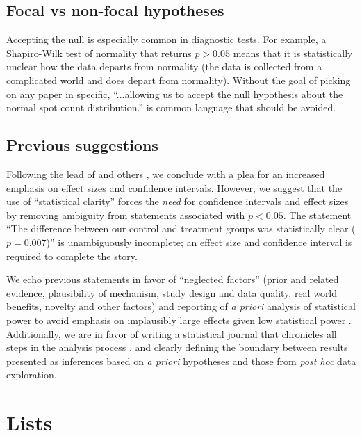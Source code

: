 \subsection*{Focal vs non-focal hypotheses}

Accepting the null is especially common in diagnostic tests.
For example, a Shapiro-Wilk test of normality that
returns $p > 0.05$ means that it is statistically unclear how the data departs from normality (the data is collected
from a complicated world and does depart from normality).
Without the goal of picking on any paper in specific, 
``...allowing us to accept the null hypothesis about the normal spot count distribution.'' \citep{Karulinetal.2015} 
is common language that should be avoided.

\subsection*{Previous suggestions}

Following the lead of \citet{Cohen1994} and others \citep{Goodman1999, ZiliakandMcCloskey2008, WassersteinandLazar2016},
we conclude with a plea for an increased emphasis on effect sizes and confidence intervals.
However, we suggest that the
use of ``statistical clarity'' forces the \emph{need} for confidence intervals and effect sizes by removing ambiguity
from statements associated with $p < 0.05$. The statement ``The difference between our control and treatment groups was
statistically clear ($p = 0.007$)'' is unambiguously incomplete; an effect size and confidence interval 
is required to complete the story.

We echo previous statements in favor of ``neglected factors'' (prior and related evidence, plausibility of mechanism, 
study design and data quality, real world benefits, novelty and other factors) \citep{McShaneetal.2017} and 
reporting of \emph{a priori} analysis of statistical power to avoid emphasis on implausibly large effects given low 
statistical power \citep[the "winners curse"][]{GelmanandCarlin2014, SzucsandIoannidis2017, Bernardietal.2017}. 
Additionally, we are in favor of writing a statistical journal that chronicles all steps in the analysis process 
\citep{Kassetal.2016}, and clearly defining the boundary between results presented as inferences based on \emph{a priori}
hypotheses and those from \emph{post hoc} data exploration.


\section*{Lists}

